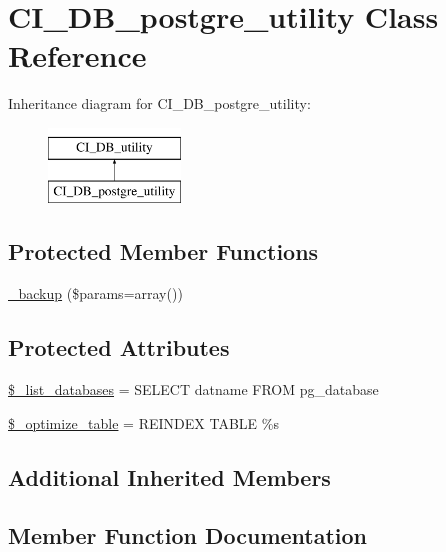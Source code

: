 \hypertarget{class_c_i___d_b__postgre__utility}{}\section{C\+I\+\_\+\+D\+B\+\_\+postgre\+\_\+utility Class Reference}
\label{class_c_i___d_b__postgre__utility}
Inheritance diagram for C\+I\+\_\+\+D\+B\+\_\+postgre\+\_\+utility\+:\begin{figure}[H]
\begin{center}
\leavevmode
\includegraphics[height=2.000000cm]{class_c_i___d_b__postgre__utility}
\end{center}
\end{figure}
\subsection*{Protected Member Functions}
\begin{DoxyCompactItemize}
\item 
\hyperlink{class_c_i___d_b__postgre__utility_a30f3053d2c82e7562349924363507afa}{\+\_\+backup} (\$params=array())
\end{DoxyCompactItemize}
\subsection*{Protected Attributes}
\begin{DoxyCompactItemize}
\item 
\hyperlink{class_c_i___d_b__postgre__utility_afe3a5b80562d93d6bc7e2b53c95b7e5a}{\$\+\_\+list\+\_\+databases} = \textquotesingle{}S\+E\+L\+E\+C\+T datname F\+R\+O\+M pg\+\_\+database\textquotesingle{}
\item 
\hyperlink{class_c_i___d_b__postgre__utility_a083199e5c22c78912dae0a47bb2d7fad}{\$\+\_\+optimize\+\_\+table} = \textquotesingle{}R\+E\+I\+N\+D\+E\+X T\+A\+B\+L\+E \%s\textquotesingle{}
\end{DoxyCompactItemize}
\subsection*{Additional Inherited Members}


\subsection{Member Function Documentation}
\hypertarget{class_c_i___d_b__postgre__utility_a30f3053d2c82e7562349924363507afa}{}
